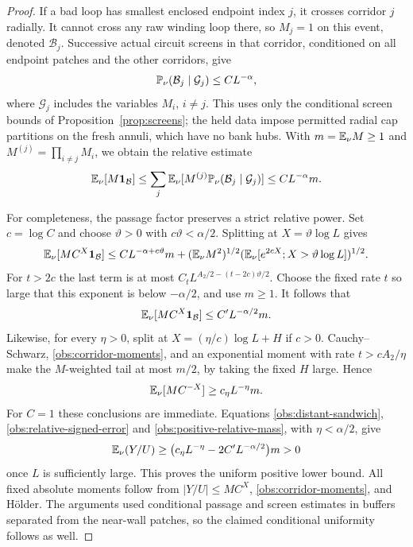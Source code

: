 \begin{proof}
If a bad loop has smallest enclosed endpoint index $j$, it crosses
corridor $j$ radially.  It cannot cross any raw winding loop there,
so $M_j=1$ on this event, denoted $\mathcal B_j$.  Successive actual
circuit screens in that corridor, conditioned on all endpoint
patches and the other corridors, give
\[
 \mathbb P_\nu(\mathcal B_j\mid\mathcal G_j)\le CL^{-\alpha},
\]
where $\mathcal G_j$ includes the variables $M_i$, $i\ne j$.
This uses only the conditional screen bounds of
Proposition~\ref{prop:screens}; the held data impose permitted
radial cap partitions on the fresh annuli, which have no bank hubs.
With $m=\mathbb E_\nu M\ge1$ and
$M^{(j)}=\prod_{i\ne j}M_i$, we obtain the relative estimate
\begin{equation}
 \mathbb E_\nu[M\mathbf 1_{\mathcal B}]
 \le\sum_j\mathbb E_\nu[M^{(j)}
            \mathbb P_\nu(\mathcal B_j\mid\mathcal G_j)]
 \le C L^{-\alpha}m.
 \label{obs:bad-before-passages}
\end{equation}

For completeness, the passage factor preserves a strict relative
power.  Set $c=\log C$ and choose $\vartheta>0$ with
$c\vartheta<\alpha/2$.  Splitting at $X=\vartheta\log L$ gives
\[
 \mathbb E_\nu[MC^X\mathbf 1_{\mathcal B}]
 \le C L^{-\alpha+c\vartheta}m
   +(\mathbb E_\nu M^2)^{1/2}
     (\mathbb E_\nu[e^{2cX};X>\vartheta\log L])^{1/2}.
\]
For $t>2c$ the last term is at most
$C_tL^{A_2/2-(t-2c)\vartheta/2}$.  Choose the fixed rate $t$
so large that this exponent is below $-\alpha/2$, and use $m\ge1$.
It follows that
\begin{equation}
 \mathbb E_\nu[MC^X\mathbf 1_{\mathcal B}]
       \le C'L^{-\alpha/2}m.
 \label{obs:relative-signed-error}
\end{equation}
Likewise, for every $\eta>0$, split at
$X=(\eta/c)\log L+H$ if $c>0$.  Cauchy--Schwarz,
\eqref{obs:corridor-moments}, and an exponential moment with rate
$t>cA_2/\eta$ make the $M$-weighted tail at most $m/2$, by taking
the fixed $H$ large.  Hence
\begin{equation}
 \mathbb E_\nu[MC^{-X}]\ge c_\eta L^{-\eta}m.
 \label{obs:positive-relative-mass}
\end{equation}
For $C=1$ these conclusions are immediate.  Equations
\eqref{obs:distant-sandwich}, \eqref{obs:relative-signed-error}
and \eqref{obs:positive-relative-mass}, with $\eta<\alpha/2$,
give
\[
 \mathbb E_\nu(Y/U)
 \ge\bigl(c_\eta L^{-\eta}-2C'L^{-\alpha/2}\bigr)m>0
\]
once $L$ is sufficiently large.  This proves the uniform positive
lower bound.  All fixed absolute moments follow from
$|Y/U|\le MC^X$, \eqref{obs:corridor-moments}, and H\"older.
The arguments used conditional passage and screen estimates in
buffers separated from the near-wall patches, so the claimed
conditional uniformity follows as well.
\end{proof}

